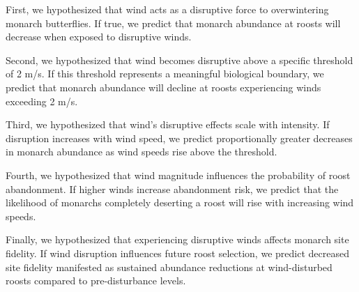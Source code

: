 First, we hypothesized that wind acts as a disruptive force to overwintering monarch butterflies. If true, we predict that monarch abundance at roosts will decrease when exposed to disruptive winds.

Second, we hypothesized that wind becomes disruptive above a specific threshold of 2 m/s. If this threshold represents a meaningful biological boundary, we predict that monarch abundance will decline at roosts experiencing winds exceeding 2 m/s.

Third, we hypothesized that wind's disruptive effects scale with intensity. If disruption increases with wind speed, we predict proportionally greater decreases in monarch abundance as wind speeds rise above the threshold.

Fourth, we hypothesized that wind magnitude influences the probability of roost abandonment. If higher winds increase abandonment risk, we predict that the likelihood of monarchs completely deserting a roost will rise with increasing wind speeds.

Finally, we hypothesized that experiencing disruptive winds affects monarch site fidelity. If wind disruption influences future roost selection, we predict decreased site fidelity manifested as sustained abundance reductions at wind-disturbed roosts compared to pre-disturbance levels.
